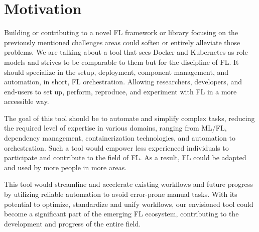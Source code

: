 \section{Motivation}

Building or contributing to a novel FL framework or library focusing on 
the previously mentioned challenges areas could soften or entirely alleviate those problems. 
We are talking about a tool that sees Docker and Kubernetes as role models
and strives to be comparable to them but for the discipline of FL.
It should specialize in the setup, deployment, component management, and automation,
in short, FL orchestration.
Allowing researchers, developers, and end-users to set up, perform, reproduce,
and experiment with FL in a more accessible way.

The goal of this tool should be to automate and simplify complex tasks,
reducing the required level of expertise in various domains, ranging from ML/FL,
dependency management, containerization technologies, and automation to orchestration.
Such a tool would empower less experienced individuals to participate and contribute to the field of FL.
As a result, FL could be adapted and used by more people in more areas.

This tool would streamline and accelerate existing workflows and future progress
by utilizing reliable automation to avoid error-prone manual tasks.
With its potential to optimize, standardize and unify workflows,
our envisioned tool could become a significant part of the emerging FL ecosystem,
contributing to the development and progress of the entire field.